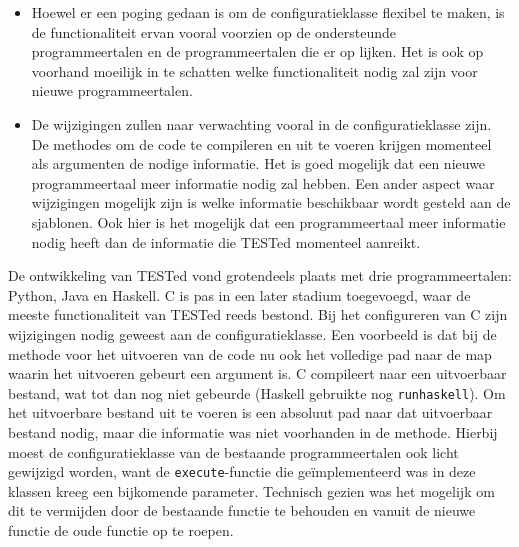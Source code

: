 \begin{itemize}
    \item Hoewel er een poging gedaan is om de configuratieklasse flexibel te maken, is de functionaliteit ervan vooral voorzien op de ondersteunde programmeertalen en de programmeertalen die er op lijken.
    Het is ook op voorhand moeilijk in te schatten welke functionaliteit nodig zal zijn voor nieuwe programmeertalen.
    \item De wijzigingen zullen naar verwachting vooral in de configuratieklasse zijn.
    De methodes om de code te compileren en uit te voeren krijgen momenteel als argumenten de nodige informatie.
    Het is goed mogelijk dat een nieuwe programmeertaal meer informatie nodig zal hebben.
    Een ander aspect waar wijzigingen mogelijk zijn is welke informatie beschikbaar wordt gesteld aan de sjablonen.
    Ook hier is het mogelijk dat een programmeertaal meer informatie nodig heeft dan de informatie die TESTed momenteel aanreikt.
\end{itemize}

De ontwikkeling van TESTed vond grotendeels plaats met drie programmeertalen: Python, Java en Haskell.
C is pas in een later stadium toegevoegd, waar de meeste functionaliteit van TESTed reeds bestond.
Bij het configureren van C zijn wijzigingen nodig geweest aan de configuratieklasse.
Een voorbeeld is dat bij de methode voor het uitvoeren van de code nu ook het volledige pad naar de map waarin het uitvoeren gebeurt een argument is.
C compileert naar een uitvoerbaar bestand, wat tot dan nog niet gebeurde (Haskell gebruikte nog \texttt{runhaskell}).
Om het uitvoerbare bestand uit te voeren is een absoluut pad naar dat uitvoerbaar bestand nodig, maar die informatie was niet voorhanden in de methode.
Hierbij moest de configuratieklasse van de bestaande programmeertalen ook licht gewijzigd worden, want de \texttt{execute}-functie die geïmplementeerd was in deze klassen kreeg een bijkomende parameter.
Technisch gezien was het mogelijk om dit te vermijden door de bestaande functie te behouden en vanuit de nieuwe functie de oude functie op te roepen.


